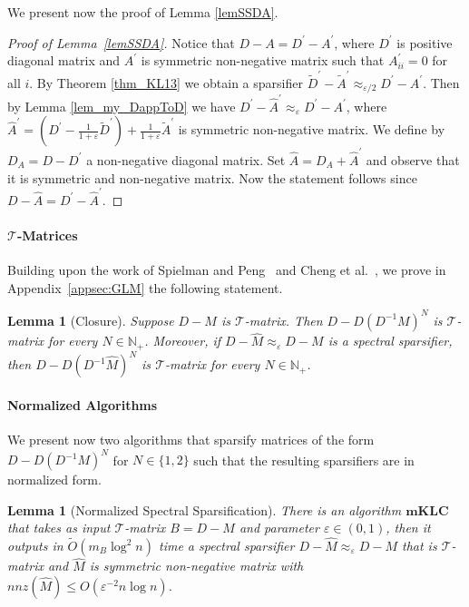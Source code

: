 \documentclass[11pt]{article}
\newcommand{\GL}{\mathcal{T}}
\newcommand{\mKLC}{\mathrm{\mathbf{mKLC}}}
\newcommand{\wD}{\widetilde{D}}
\newcommand{\wA}{\widetilde{A}}
\newcommand{\wO}{\widetilde{O}}
\newcommand{\hM}{\widehat{M}}
\newcommand{\hA}{\widehat{A}}
\newcommand{\Di}{D^{-1}}
\newcommand{\prm}{\prime}
\newcommand{\N}{\mathbb{N}}
\newcommand{\eps}{\epsilon}
\renewcommand{\leq}{\leqslant}
\renewcommand{\eps}{\varepsilon}
\newtheorem{lem}[thm]{Lemma}
\numberwithin{thm}{section}
\begin{document}
We present now the proof of Lemma \ref{lemSSDA}.

\begin{proof}[Proof of Lemma~\ref{lemSSDA}] Notice that $D-A=D^\prm-A^\prm$, where $D^\prm$ is positive diagonal matrix and $A^\prm$ is symmetric non-negative matrix such that $A_{ii}^\prm=0$ for all $i$.
By Theorem \ref{thm_KL13} we obtain a sparsifier $\wD^\prm-\wA^\prm\approx_{\eps/2}D^\prm-A^\prm$. Then by Lemma \ref{lem_my_DappToD} we have  $D^\prm-\hA^\prm\approx_{\eps}D^\prm-A^\prm$, where $\hA^\prm=(D^\prm-\frac{1}{1+\eps}\wD^\prm)+\frac{1}{1+\eps}\wA^\prm$ is symmetric non-negative matrix. We define by $D_{A}=D-D^\prm$ a non-negative diagonal matrix. Set $\hA=D_{A}+\hA^\prm$ and observe that it is symmetric and non-negative matrix. Now the statement follows since $D-\hA=D^\prm-\hA^\prm$.
\end{proof}

\paragraph*{$\GL$-Matrices}
Building upon the work of Spielman and Peng~\cite[Proposition 5.6]{PS14} and Cheng et al.~\cite[Proposition 25]{CCLPT15}, we prove in Appendix~\ref{appsec:GLM} the following statement.

\begin{lem}[Closure]\label{lem_Closure}
Suppose $D-M$ is $\GL$-matrix. Then $D-D(\Di M)^{N}$ is $\GL$-matrix for every $N\in\N_{+}$. Moreover, if $D-\hM\approx_{\eps}D-M$ is a spectral sparsifier, then $D-D(\Di \hM)^{N}$ is $\GL$-matrix for every $N\in\N_{+}$.
\end{lem}

\paragraph*{Normalized Algorithms} We present now two algorithms that sparsify matrices of the form $D-D(\Di M)^N$ for $N\in\{1,2\}$ such that the resulting sparsifiers are in normalized form.


\begin{lem}[Normalized Spectral Sparsification]\label{lem_SS_GL}
There is an algorithm $\mKLC$
that takes as input $\GL$-matrix $B=D-M$ and parameter
$\eps\in(0,1)$, then it outputs in $\wO(m_{B}\log^{2}n)$
time a spectral sparsifier $D-\hM\approx_{\eps}D-M$ that is $\GL$-matrix and $\hM$
is symmetric non-negative matrix with $nnz(\hM)\leq O(\eps^{-2}n\log n)$.
\end{lem}
\end{document}
